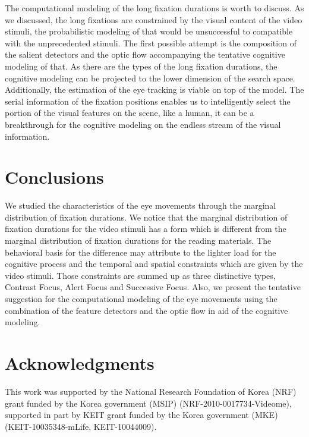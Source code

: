 \documentclass[10pt,letterpaper]{article}
\begin{document}
The computational modeling of the long fixation durations is worth to discuss. As we discussed, the long fixations are constrained by the visual content of the video stimuli, the probabilistic modeling of that would be unsuccessful to compatible with the unprecedented stimuli. The first possible attempt is the composition of the salient detectors \cite{marr1980,canny1986} and the optic flow \cite{koenderink1986} accompanying the tentative cognitive modeling of that. As there are the types of the long fixation durations, the cognitive modeling can be projected to the lower dimension of the search space. Additionally, the estimation of the eye tracking is viable on top of the model. The serial information of the fixation positions enables us to intelligently select the portion of the visual features on the scene, like a human, it can be a breakthrough for the cognitive modeling on the endless stream of the visual information.


\section{Conclusions}

We studied the characteristics of the eye movements through the marginal distribution of fixation durations. We notice that the marginal distribution of fixation durations for the video stimuli has a form which is different from the marginal distribution of fixation durations for the reading materials. The behavioral basis for the difference may attribute to the lighter load for the cognitive process and the temporal and spatial constraints which are given by the video stimuli. Those constraints are summed up as three distinctive types, Contrast Focus, Alert Focus and Successive Focus. Also, we present the tentative suggestion for the computational modeling of the eye movements using the combination of the feature detectors and the optic flow in aid of the cognitive modeling.


\section{Acknowledgments}

This work was supported by the National Research Foundation of Korea (NRF) grant funded by the Korea government (MSIP) (NRF-2010-0017734-Videome), supported in part by KEIT grant funded by the Korea government (MKE) (KEIT-10035348-mLife, KEIT-10044009).



\setlength{\bibleftmargin}{.125in}
\setlength{\bibindent}{-\bibleftmargin}


\end{document}
